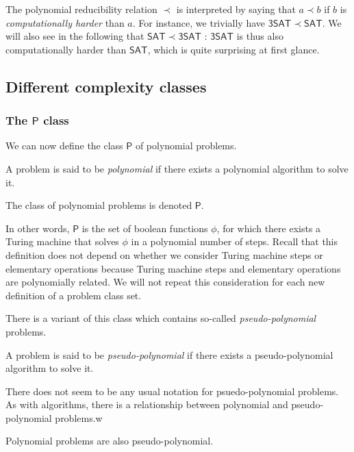 The polynomial reducibility relation $ \prec $ is interpreted by saying that $ a \prec b $ if $ b $ is \textit{computationally harder} than $ a $. For instance, we trivially have $ \mathsf{3SAT} \prec \mathsf{SAT} $. We will also see in the following that $ \mathsf{SAT} \prec \mathsf{3SAT} $ : $ \mathsf{3SAT} $ is thus also computationally harder than $ \mathsf{SAT} $, which is quite surprising at first glance.

\subsection{Different complexity classes}

\subsubsection{The $ \mathsf P $ class}

We can now define the class $ \mathsf P $ of polynomial problems.

\begin{definition}
    A problem is said to be \textit{polynomial} if there exists a polynomial algorithm to solve it.

    The class of polynomial problems is denoted $ \mathsf P $.
\end{definition}

In other words, $ \mathsf P $ is the set of boolean functions $ \phi $, for which there exists a Turing machine that solves $ \phi $ in a polynomial number of steps. Recall that this definition does not depend on whether we consider Turing machine steps or elementary operations because Turing machine steps and elementary operations are polynomially related. We will not repeat this consideration for each new definition of a problem class set.

There is a variant of this class which contains so-called \textit{pseudo-polynomial} problems.

\begin{definition}
    A problem is said to be \textit{pseudo-polynomial} if there exists a pseudo-polynomial algorithm to solve it.
\end{definition}

There does not seem to be any usual notation for psuedo-polynomial problems. As with algorithms, there is a relationship between polynomial and pseudo-polynomial problems.w

\begin{proposition}
    Polynomial problems are also pseudo-polynomial.
\end{proposition}

